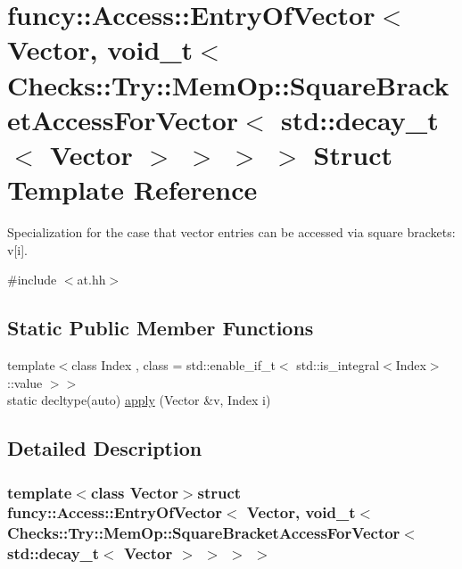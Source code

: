 \hypertarget{structfuncy_1_1Access_1_1EntryOfVector_3_01Vector_00_01void__t_3_01Checks_1_1Try_1_1MemOp_1_1Squ5cd836559cca83db378509772a83f5e4}{\section{funcy\-:\-:Access\-:\-:Entry\-Of\-Vector$<$ Vector, void\-\_\-t$<$ Checks\-:\-:Try\-:\-:Mem\-Op\-:\-:Square\-Bracket\-Access\-For\-Vector$<$ std\-:\-:decay\-\_\-t$<$ Vector $>$ $>$ $>$ $>$ Struct Template Reference}
\label{structfuncy_1_1Access_1_1EntryOfVector_3_01Vector_00_01void__t_3_01Checks_1_1Try_1_1MemOp_1_1Squ5cd836559cca83db378509772a83f5e4}
}


Specialization for the case that vector entries can be accessed via square brackets\-: v\mbox{[}i\mbox{]}.  




{\ttfamily \#include $<$at.\-hh$>$}

\subsection*{Static Public Member Functions}
\begin{DoxyCompactItemize}
\item 
{\footnotesize template$<$class Index , class  = std\-::enable\-\_\-if\-\_\-t$<$ std\-::is\-\_\-integral$<$\-Index$>$\-::value $>$$>$ }\\static decltype(auto) \hyperlink{structfuncy_1_1Access_1_1EntryOfVector_3_01Vector_00_01void__t_3_01Checks_1_1Try_1_1MemOp_1_1Squ5cd836559cca83db378509772a83f5e4_afa3f896f3dcd730fd1f81795c5f3c2ae}{apply} (Vector \&v, Index i)
\end{DoxyCompactItemize}


\subsection{Detailed Description}
\subsubsection*{template$<$class Vector$>$struct funcy\-::\-Access\-::\-Entry\-Of\-Vector$<$ Vector, void\-\_\-t$<$ Checks\-::\-Try\-::\-Mem\-Op\-::\-Square\-Bracket\-Access\-For\-Vector$<$ std\-::decay\-\_\-t$<$ Vector $>$ $>$ $>$ $>$}

